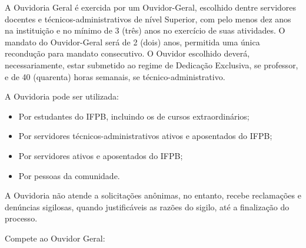A Ouvidoria Geral é exercida por um Ouvidor-Geral, escolhido dentre servidores docentes e técnicos-administrativos de nível Superior, com pelo menos dez anos na instituição e no mínimo de 3 (três) anos no exercício de suas atividades. O mandato do Ouvidor-Geral será de 2 (dois) anos, permitida uma única recondução para mandato consecutivo. O Ouvidor escolhido deverá, necessariamente, estar submetido ao regime de Dedicação Exclusiva, se professor, e de 40 (quarenta) horas semanais, se técnico-administrativo.

                 A Ouvidoria pode ser utilizada:

\begin{itemize}
\item Por estudantes do IFPB, incluindo os de cursos extraordinários;

\item Por servidores técnicos-administrativos ativos e aposentados do IFPB;

\item Por servidores ativos e aposentados do IFPB;

\item Por pessoas da comunidade.
\end{itemize}

	A Ouvidoria não atende a solicitações anônimas, no entanto, recebe reclamações e denúncias sigilosas, quando justificáveis as razões do sigilo, até a finalização do processo.

          Compete ao Ouvidor Geral:

